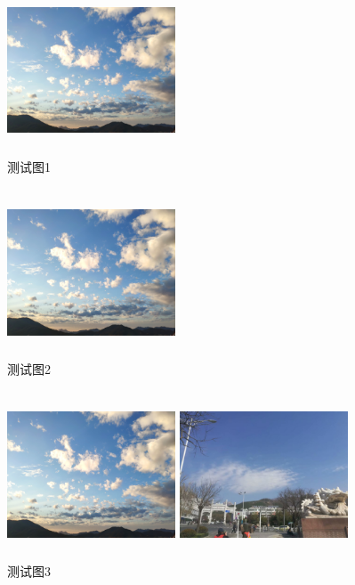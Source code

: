 \documentclass{ctexart}
\begin{document}
	
	\begin{figure}[htbp]
	\centering
	\includegraphics[width=5cm,height=5cm]{pic1.jpg}
	\caption{测试图1}
	\label{fig:1}
	\end{figure}	

	\begin{figure}[!htbp]
	\centering
	\includegraphics[width=5cm,height=5cm]{pic1.jpg}
	\caption{测试图2}
	\label{fig:2}
	\end{figure}	

	\begin{figure}[htbp]
	\centering
	\begin{minipage}[t]{0.5\textwidth}
	\centering
	 \includegraphics[width=5cm,height=5cm]{pic1}	
	\end{minipage}%
	\begin{minipage}[b]{0.5\textwidth}
	\centering
	\includegraphics[width=5cm,height=5cm]{pic2}	
	\end{minipage}
	\caption{测试图3}
		\label{fig:3}
	\end{figure}
	
\end{document}
